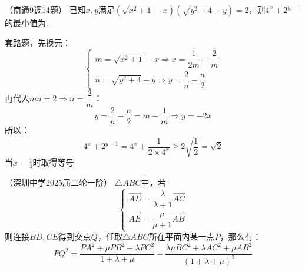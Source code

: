 \begin{example}{（南通9调14题）}{}
    已知$x,y$满足$(\sqrt{x^2+1}-x)(\sqrt{y^2+4}-y)=2$，则$4^{x}+2^{y-1}$的最小值为\underline{\hspace{1cm}}.
\end{example}
\begin{solution}
    套路题，先换元：\[
    \begin{cases}
        m=\sqrt{x^2+1}-x\Rightarrow x=\dfrac{1}{2m}-\dfrac{2}{m}\\[8pt]
        n=\sqrt{y^2+4}-y\Rightarrow y=\dfrac{2}{n}-\dfrac{n}{2}\end{cases}
    \]
    再代入$mn=2\Rightarrow n=\dfrac{2}{m}$：
    \[y=\dfrac{2}{n}-\dfrac{n}{2}=m-\dfrac{1}{m}\Rightarrow y=-2x\]
    所以：\[4^{x}+2^{y-1}=4^{x}+\dfrac{1}{2\times 4^x}\geq 2\sqrt{\dfrac{1}{2}}=\sqrt2\]当$x=\frac14$时取得等号
\end{solution}
\newpage
\begin{example}{（深圳中学2025届二轮一阶）}{}
    \noindent$\triangle{ABC}$中，若
    \[\begin{cases}\overrightarrow{AD}=\dfrac{\lambda}{\lambda+1}\overrightarrow{AC}\\
        \overrightarrow{AE}=\dfrac{\mu}{\mu+1}\overrightarrow{AB}\end{cases}\]
    \noindent 则连接$BD,CE$得到交点$Q$，任取$\triangle{ABC}$所在平面内某一点$P$，那么有：\[
    PQ^2=\dfrac{PA^2+\mu PB^2+\lambda PC^2}{1+\lambda+\mu}-\dfrac{\lambda\mu BC^2+\lambda AC^2+\mu AB^2}{\left(1+\lambda+\mu\right)^2}
    \]
\end{example}
